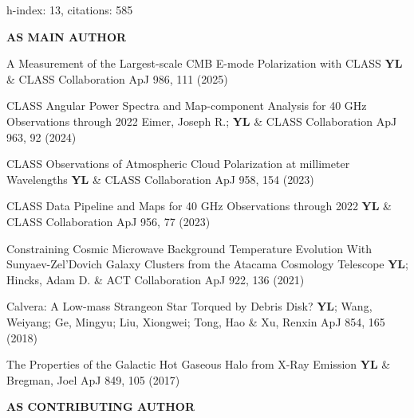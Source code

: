 \hfill\textmd{h-index: 13, citations: 585}
\begin{footnotesize}
    \textsf{\textbf{ AS MAIN AUTHOR }}
\end{footnotesize}
\begin{etaremune}[topsep=0pt,itemsep=0pt,partopsep=0pt,parsep=0pt]
    \renewcommand\labelenumi{\footnotesize\bfseries\theenumi.}

            {A Measurement of the Largest-scale CMB E-mode Polarization with CLASS}
            {\textbf{YL} \& CLASS Collaboration}
            {ApJ 986, 111 (2025)}

            {CLASS Angular Power Spectra and Map-component Analysis for 40 GHz Observations through 2022}
            {Eimer, Joseph R.; \textbf{YL} \& CLASS Collaboration}
            {ApJ 963, 92 (2024)}

            {CLASS Observations of Atmospheric Cloud Polarization at millimeter Wavelengths}
            {\textbf{YL} \& CLASS Collaboration}
            {ApJ 958, 154 (2023)}

            {CLASS Data Pipeline and Maps for 40 GHz Observations through 2022}
            {\textbf{YL} \& CLASS Collaboration}
            {ApJ 956, 77 (2023)}

            {Constraining Cosmic Microwave Background Temperature Evolution With Sunyaev-Zel'Dovich Galaxy Clusters from the Atacama Cosmology Telescope}
            {\textbf{YL}; Hincks, Adam D. \& ACT Collaboration}
            {ApJ 922, 136 (2021)}

            {Calvera: A Low-mass Strangeon Star Torqued by Debris Disk?}
            {\textbf{YL}; Wang, Weiyang; Ge, Mingyu; Liu, Xiongwei; Tong, Hao \& Xu, Renxin}
            {ApJ 854, 165 (2018)}

            {The Properties of the Galactic Hot Gaseous Halo from X-Ray Emission}
            {\textbf{YL} \& Bregman, Joel}
            {ApJ 849, 105 (2017)}

\end{etaremune}
\begin{footnotesize}
    \textsf{\textbf{ AS CONTRIBUTING AUTHOR }}
\end{footnotesize}
